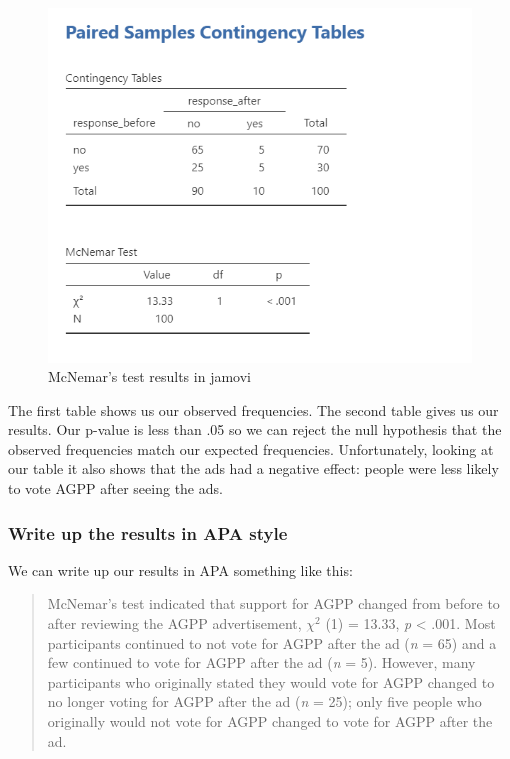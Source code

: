 \documentclass[
]{book}
\begin{document}
\begin{figure}

{\centering \includegraphics[width=1\linewidth]{images/12-mcnemar/mcnemar_results} 

}

\caption{McNemar's test results in jamovi}\label{fig:unnamed-chunk-2}
\end{figure}

The first table shows us our observed frequencies. The second table gives us our results. Our p-value is less than .05 so we can reject the null hypothesis that the observed frequencies match our expected frequencies. Unfortunately, looking at our table it also shows that the ads had a negative effect: people were less likely to vote AGPP after seeing the ads.

\hypertarget{write-up-the-results-in-apa-style-5}{%
\subsubsection{Write up the results in APA style}\label{write-up-the-results-in-apa-style-5}}

We can write up our results in APA something like this:

\begin{quote}
McNemar's test indicated that support for AGPP changed from before to after reviewing the AGPP advertisement, \(\chi^2\) (1) = 13.33, \emph{p} \textless{} .001. Most participants continued to not vote for AGPP after the ad (\emph{n} = 65) and a few continued to vote for AGPP after the ad (\emph{n} = 5). However, many participants who originally stated they would vote for AGPP changed to no longer voting for AGPP after the ad (\emph{n} = 25); only five people who originally would not vote for AGPP changed to vote for AGPP after the ad.
\end{quote}
\end{document}
